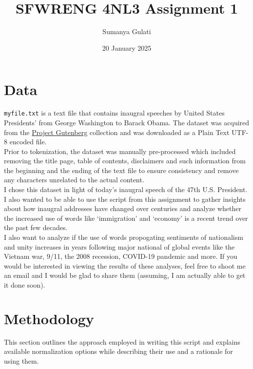 \documentclass[titlepage]{article}
\title{SFWRENG 4NL3 Assignment 1}
\author{Sumanya Gulati}
\date{20 January 2025}
\begin{document}
\begin{titlepage}
    \maketitle
\end{titlepage}

\newpage 

\tableofcontents
\listoftables
\listoffigures

\newpage

\section{Data}
\texttt{myfile.txt} is a text file that contains inaugral speeches by United States Presidents'
from George Washington to Barack Obama. The dataset was acquired from the
\href{https://www.gutenberg.org/ebooks/4938}{Project Gutenberg} collection and was downloaded 
as a Plain Text UTF-8 encoded file. \\

Prior to tokenization, the dataset was manually pre-processed which included removing the title
page, table of contents, disclaimers and such information from the beginning and the ending of 
the text file to ensure consistency and remove any characters unrelated to the actual content.\\

I chose this dataset in light of today's inaugral speech of the 47th U.S. President. I also
wanted to be able to use the script from this assignment to gather insights about how inaugral
addresses have changed over centuries and analyze whether the increased use of words like 
`immigration' and `economy' is a recent trend over the past few decades.\\

I also want to analyze if the use of words propogating sentiments of nationalism and unity
increases in years following major national of global events like the Vietnam war, 9/11, the
2008 recession, COVID-19 pandemic and more. If you would be interested in viewing the results
of these analyses, feel free to shoot me an email and I would be glad to share them (assuming,
I am actually able to get it done soon).

\section{Methodology}
This section outlines the approach employed in writing this script and explains available
normalization options while describing their use and a rationale for using them.
\end{document}
